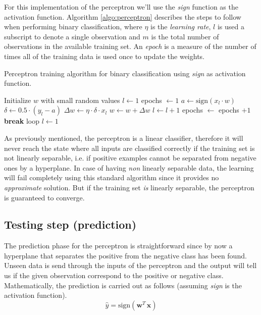 For this implementation of the perceptron we'll use the \textit{sign} function as the activation function. Algorithm \ref{algo:perceptron} describes the steps to follow when performing binary classification, where $\eta$ is the \textit{learning rate}, $l$ is used a subscript to denote a single observation and $m$ is the total number of observations in the available training set. An \textit{epoch} is a measure of the number of times all of the training data is used once to update the weights.
\begin{algorithm}
	\caption{Perceptron training algorithm for binary classification using \textit{sign} as activation function.}
	\label{algo:perceptron}
	\begin{algorithmic}
		\Ensure Initialize $w$ with small random values
		\State $ l \gets 1$
		\State epochs $\gets 1$
		\Repeat
		\State $a \gets \text{sign}(x_l \cdot w)$
		\State $\delta \gets 0.5 \cdot (y_l - a)$ 
		\State $\Delta w \gets \eta \cdot \delta \cdot x_l$
		\State $w \gets w + \Delta w$
		\State $l \gets l + 1$ 
			\State epochs $\gets$ epochs $+1$
				\State \textbf{break} loop
			\EndIf
			\State $ l \gets 1$ 
		\EndIf	
	\end{algorithmic}
\end{algorithm}

As previously mentioned, the perceptron is a linear classifier, therefore it will never reach the state where all inputs are classified correctly if the training set is not linearly separable, i.e. if positive examples cannot be separated from negative ones by a hyperplane. In case of having \textit{non} linearly separable data, the learning will fail completely using this standard algorithm since it provides no \textit{approximate} solution. But if the training set \textit{is} linearly separable, the perceptron is guaranteed to converge.

\subsection{Testing step (prediction)}

The prediction phase for the perceptron is straightforward since by now a hyperplane that separates the positive from the negative class has been found. Unseen data is send through the inputs of the perceptron and the output will tell us if the given observation correspond to the positive or negative class. Mathematically, the prediction is carried out as follows (assuming \textit{sign} is the activation function).
\begin{equation}
\hat{y} = \text{sign}(\boldsymbol{w}^T \, \boldsymbol{x})
\end{equation}

